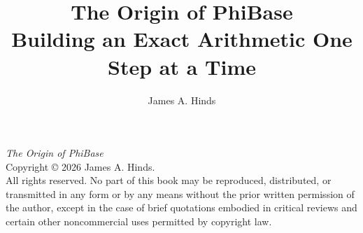 \documentclass[11pt,openany]{book}
\title{\textbf{The Origin of PhiBase}\\[0.5em]
\large Building an Exact Arithmetic One Step at a Time}
\author{James A. Hinds}
\date{}
\begin{document}
\frontmatter
\maketitle

\thispagestyle{empty}
\vspace*{\fill}
\begin{center}
\small
\textit{The Origin of PhiBase}\\[0.4em]
Copyright \copyright{} 2026 James A. Hinds.\\[0.4em]
All rights reserved. No part of this book may be reproduced, distributed,
or transmitted in any form or by any means without the prior written
permission of the author, except in the case of brief quotations
embodied in critical reviews and certain other noncommercial uses
permitted by copyright law.
\end{center}
\vspace*{\fill}
\clearpage



\tableofcontents


\mainmatter
















\backmatter
% 
\end{document}
